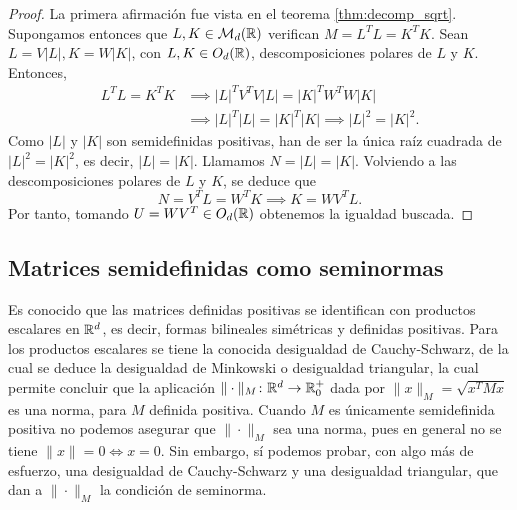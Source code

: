 \begin{proof}
    La primera afirmación fue vista en el teorema \ref{thm:decomp_sqrt}. Supongamos entonces que $L, K \in \mathcal{M}_d(\mathbb{R})$ verifican $M = L^TL = K^TK$. Sean $L = V|L|, K = W|K|$, con $L, K \in O_d(\mathbb{R})$, descomposiciones polares de $L$ y $K$. Entonces,
    \begin{align*}
        L^TL = K^TK &\implies |L|^TV^TV|L| = |K|^TW^TW|K| \\
                    &\implies |L|^T|L| = |K|^T|K| \implies |L|^2 = |K|^2.
    \end{align*}
    Como $|L|$ y $|K|$ son semidefinidas positivas, han de ser la única raíz cuadrada de $|L|^2 = |K|^2$, es decir, $|L|=|K|$. Llamamos $N = |L| = |K|$. Volviendo a las descomposiciones polares de $L$ y $K$, se deduce que
    \[ N = V^TL = W^TK \implies K = WV^TL. \]
    Por tanto, tomando $U = WV^T \in O_d(\mathbb{R})$ obtenemos la igualdad buscada.
\end{proof}

\subsection{Matrices semidefinidas como seminormas}

Es conocido que las matrices definidas positivas se identifican con productos escalares en $\mathbb{R}^d$, es decir, formas bilineales simétricas y definidas positivas. Para los productos escalares se tiene la conocida desigualdad de Cauchy-Schwarz, de la cual se deduce la desigualdad de Minkowski o desigualdad triangular, la cual permite concluir que la aplicación $\|\cdot\|_M \colon \mathbb{R}^d \to \mathbb{R}^+_0$ dada por $\|x\|_M = \sqrt{x^TMx}$ es una norma, para $M$ definida positiva. Cuando $M$ es únicamente semidefinida positiva no podemos asegurar que $\|\cdot\|_M$ sea una norma, pues en general no se tiene $\|x\| = 0 \iff x = 0$. Sin embargo, sí podemos probar, con algo más de esfuerzo, una desigualdad de Cauchy-Schwarz y una desigualdad triangular, que dan a $\|\cdot\|_M$ la condición de seminorma.

